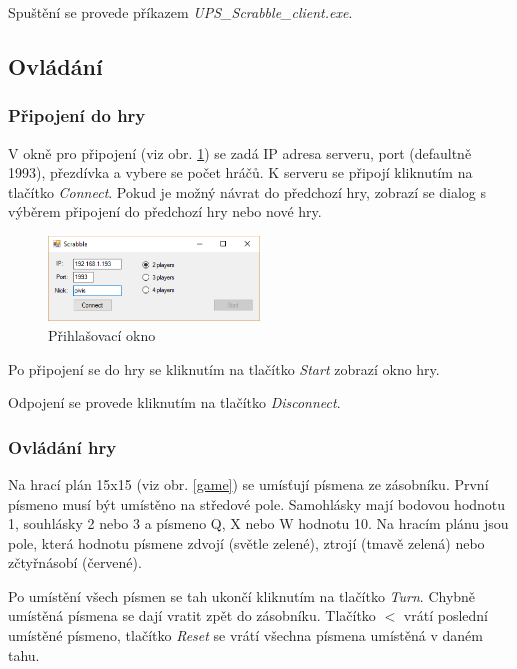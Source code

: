 Spuštění se provede příkazem \emph{UPS\_Scrabble\_client.exe}.

\subsection{Ovládání}
\subsubsection{Připojení do hry}
V okně pro připojení (viz obr. \ref{main}) se zadá IP adresa serveru, port (defaultně 1993), přezdívka a vybere se počet hráčů. K serveru se připojí kliknutím na tlačítko \emph{Connect}. Pokud je možný návrat do předchozí hry, zobrazí se dialog s výběrem připojení do předchozí hry nebo nové hry.

\begin{figure}[H]
	\centering
	\includegraphics[width=0.5\textwidth]{img/main.eps}
	\caption{Přihlašovací okno}
  \label{main}
\end{figure}

Po připojení se do hry se kliknutím na tlačítko \emph{Start} zobrazí okno hry.

Odpojení se provede kliknutím na tlačítko \emph{Disconnect}.

\subsubsection{Ovládání hry}
Na hrací plán 15x15 (viz obr. \ref{game}) se umísťují písmena ze zásobníku. První písmeno musí být umístěno na středové pole. Samohlásky mají bodovou hodnotu 1, souhlásky 2 nebo 3 a písmeno Q, X nebo W hodnotu 10. Na hracím plánu jsou pole, která hodnotu písmene zdvojí (světle zelené), ztrojí (tmavě zelená) nebo zčtyřnásobí (červené). 

Po umístění všech písmen se tah ukončí kliknutím na tlačítko \emph{Turn}. Chybně umístěná písmena se dají vratit zpět do zásobníku. Tlačítko \emph{$<$} vrátí poslední umístěné písmeno, tlačítko \emph{Reset} se vrátí všechna písmena umístěná v daném tahu.

